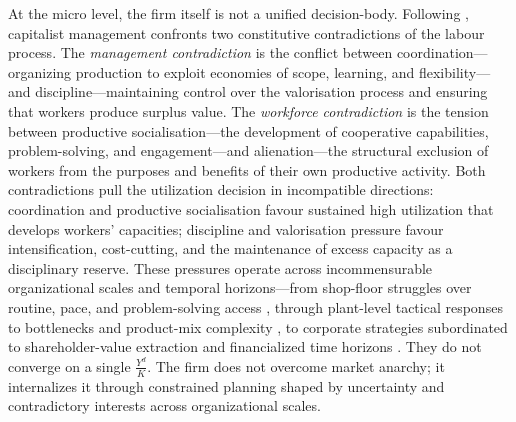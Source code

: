 \documentclass[11pt,a4paper]{article}
\begin{document}
At the micro level, the firm itself is not a unified decision-body. Following \citet{Vidal2022}, capitalist management confronts two constitutive contradictions of the labour process. The \textit{management contradiction} is the conflict between coordination---organizing production to exploit economies of scope, learning, and flexibility---and discipline---maintaining control over the valorisation process and ensuring that workers produce surplus value. The \textit{workforce contradiction} is the tension between productive socialisation---the development of cooperative capabilities, problem-solving, and engagement---and alienation---the structural exclusion of workers from the purposes and benefits of their own productive activity. Both contradictions pull the utilization decision in incompatible directions: coordination and productive socialisation favour sustained high utilization that develops workers' capacities; discipline and valorisation pressure favour intensification, cost-cutting, and the maintenance of excess capacity as a disciplinary reserve. These pressures operate across incommensurable organizational scales and temporal horizons---from shop-floor struggles over routine, pace, and problem-solving access \citep{Vazquez2006}, through plant-level tactical responses to bottlenecks and product-mix complexity \citep{Anderson2001}, to corporate strategies subordinated to shareholder-value extraction and financialized time horizons \citep{LazonickOsullivan2000}. They do not converge on a single $\frac{Y^d}{K}$. The firm does not overcome market anarchy; it internalizes it through constrained planning shaped by uncertainty and contradictory interests across organizational scales.
\end{document}
